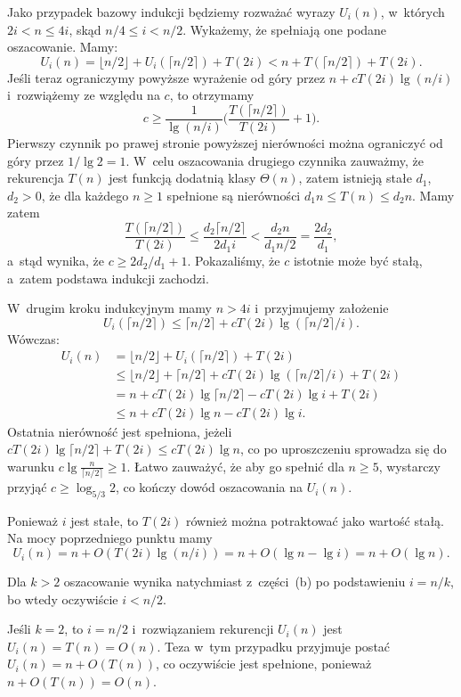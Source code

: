Jako przypadek bazowy indukcji będziemy rozważać wyrazy $U_i(n)$, w~których $2i<n\le4i$, skąd $n/4\le i<n/2$.
Wykażemy, że spełniają one podane oszacowanie.
Mamy:
\[
    U_i(n) = \lfloor n/2\rfloor+U_i(\lceil n/2\rceil)+T(2i) < n+T(\lceil n/2\rceil)+T(2i).
\]
Jeśli teraz ograniczymy powyższe wyrażenie od góry przez $n+cT(2i)\lg(n/i)$ i~rozwiążemy ze względu na $c$, to otrzymamy
\[
    c \ge \frac{1}{\lg(n/i)}\biggl(\frac{T(\lceil n/2\rceil)}{T(2i)}+1\biggr).
\]
Pierwszy czynnik po prawej stronie powyższej nierówności można ograniczyć od góry przez $1/\lg2=1$.
W~celu oszacowania drugiego czynnika zauważmy, że rekurencja $T(n)$ jest funkcją dodatnią klasy $\Theta(n)$, zatem istnieją stałe $d_1$, $d_2>0$, że dla każdego $n\ge1$ spełnione są nierówności $d_1n\le T(n)\le d_2n$.
Mamy zatem
\[
    \frac{T(\lceil n/2\rceil)}{T(2i)} \le \frac{d_2\lceil n/2\rceil}{2d_1i} < \frac{d_2n}{d_1n/2} = \frac{2d_2}{d_1},
\]
a~stąd wynika, że $c\ge2d_2/d_1+1$.
Pokazaliśmy, że $c$ istotnie może być stałą, a~zatem podstawa indukcji zachodzi.

W~drugim kroku indukcyjnym mamy $n>4i$ i~przyjmujemy założenie
\[
    U_i(\lceil n/2\rceil) \le \lceil n/2\rceil+cT(2i)\lg(\lceil n/2\rceil/i).
\]
Wówczas:
\begin{align*}
    U_i(n) &= \lfloor n/2\rfloor+U_i(\lceil n/2\rceil)+T(2i) \\
	&\le \lfloor n/2\rfloor+\lceil n/2\rceil+cT(2i)\lg(\lceil n/2\rceil/i)+T(2i) \\
	&= n+cT(2i)\lg\lceil n/2\rceil-cT(2i)\lg i+T(2i) \\
	&\le n+cT(2i)\lg n-cT(2i)\lg i.
\end{align*}
Ostatnia nierówność jest spełniona, jeżeli $cT(2i)\lg\lceil n/2\rceil+T(2i)\le cT(2i)\lg n$, co po uproszczeniu sprowadza się do warunku $c\lg\frac{n}{\lceil n/2\rceil}\ge1$.
Łatwo zauważyć, że aby go spełnić dla $n\ge5$, wystarczy przyjąć $c\ge\log_{5/3}2$, co kończy dowód oszacowania na $U_i(n)$.

\subproblem %
Ponieważ $i$ jest stałe, to $T(2i)$ również można potraktować jako wartość stałą.
Na mocy poprzedniego punktu mamy
\[
	U_i(n) = n+O(T(2i)\lg(n/i)) = n+O(\lg n-\lg i) = n+O(\lg n).
\]

\subproblem %
Dla $k>2$ oszacowanie wynika natychmiast z~części~(b) po podstawieniu $i=n/k$, bo wtedy oczywiście $i<n/2$.

Jeśli $k=2$, to $i=n/2$ i~rozwiązaniem rekurencji $U_i(n)$ jest $U_i(n)=T(n)=O(n)$.
Teza w~tym przypadku przyjmuje postać $U_i(n)=n+O(T(n))$, co oczywiście jest spełnione, ponieważ $n+O(T(n))=O(n)$.

\endinput
